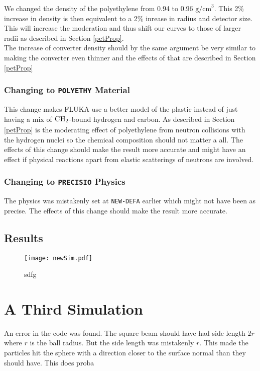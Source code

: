 \documentclass[a4paper,10pt]{article}
\newcommand{\nucl}[3]{
\ensuremath{
\phantom{\ensuremath{^{#1}_{#2}}}
\llap{\ensuremath{^{#1}}}
\llap{\ensuremath{_{\rule{0pt}{.75em}#2}}}
\mbox{#3}
}
}
\begin{document}
We changed the density of the polyethylene from 0.94 to 0.96 $\mathrm{g/cm}^3$. This 2\% increase in density is then equivalent to a 2\% inrease in radius and detector size. This will increase the moderation and thus shift our curves to those of larger radii as described in Section \ref{petProp}.\\
The increase of converter density should by the same argument be very similar to making the converter even thinner and the effects of that are described in Section \ref{petProp} 
\subsubsection{Changing to \texttt{POLYETHY} Material}
This change makes FLUKA use a better model of the plastic instead of just having a mix of $\nucl{}{}{C}\nucl{}{}{H}_2$-bound hydrogen and carbon. As described in Section \ref{petProp} is the moderating effect of polyethylene from neutron collisions with the hydrogen nuclei so the chemical composition should not matter a all. The effects of this change should make the result more accurate and might have an effect if physical reactions apart from elastic scatterings of neutrons are involved.
\subsubsection{Changing to \texttt{PRECISIO} Physics}
The physics was mistakenly set at \verb!NEW-DEFA! earlier which might not have been as precise. The effects of this change should make the result more accurate.
\subsection{Results}
\begin{figure}
\centering
\texttt{[image: newSim.pdf]}
\caption
{sdfg}\label{newsim}
\end{figure}
\section{A Third Simulation}
An error in the code was found. The square beam should have had side length $2r$ where $r$ is the ball radius. But the side length was mistakenly $r$. This made the particles hit the sphere with a direction closer to the surface normal than they should have. This does proba


\end{document}
